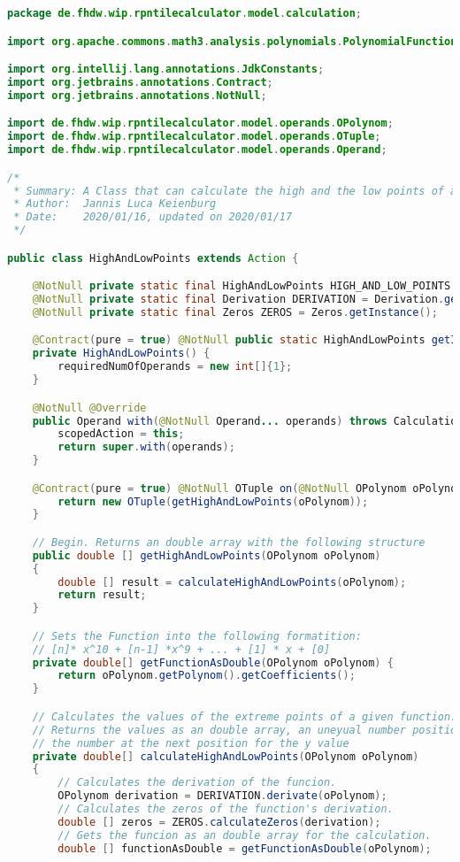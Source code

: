 \begin{lstlisting}[caption=HighAndLowPoints (Keienburg),label=list:HighAndLowPoints,language=Java]
package de.fhdw.wip.rpntilecalculator.model.calculation;

import org.apache.commons.math3.analysis.polynomials.PolynomialFunction;

import org.intellij.lang.annotations.JdkConstants;
import org.jetbrains.annotations.Contract;
import org.jetbrains.annotations.NotNull;

import de.fhdw.wip.rpntilecalculator.model.operands.OPolynom;
import de.fhdw.wip.rpntilecalculator.model.operands.OTuple;
import de.fhdw.wip.rpntilecalculator.model.operands.Operand;

/*
 * Summary: A Class that can calculate the high and the low points of a function( up to third grade)
 * Author:  Jannis Luca Keienburg
 * Date:    2020/01/16, updated on 2020/01/17
 */

public class HighAndLowPoints extends Action {

    @NotNull private static final HighAndLowPoints HIGH_AND_LOW_POINTS = new HighAndLowPoints();
    @NotNull private static final Derivation DERIVATION = Derivation.getInstance();
    @NotNull private static final Zeros ZEROS = Zeros.getInstance();

    @Contract(pure = true) @NotNull public static HighAndLowPoints getInstance() { return HIGH_AND_LOW_POINTS; }
    private HighAndLowPoints() {
        requiredNumOfOperands = new int[]{1};
    }

    @NotNull @Override
    public Operand with(@NotNull Operand... operands) throws CalculationException {
        scopedAction = this;
        return super.with(operands);
    }

    @Contract(pure = true) @NotNull OTuple on(@NotNull OPolynom oPolynom) {
        return new OTuple(getHighAndLowPoints(oPolynom));
    }

    // Begin. Returns an double array with the following structure
    public double [] getHighAndLowPoints(OPolynom oPolynom)
    {
        double [] result = calculateHighAndLowPoints(oPolynom);
        return result;
    }

    // Sets the Function into the following formatition:
    // [n]* x^10 + [n-1] *x^9 + ... + [1] * x + [0]
    private double[] getFunctionAsDouble(OPolynom oPolynom) {
        return oPolynom.getPolynom().getCoefficients();
    }

    // Calculates the values of the extreme points of a given function.
    // Returns the values as an double array, an uneyual number position stands for the x value,
    // the number at the next position for the y value
    private double[] calculateHighAndLowPoints(OPolynom oPolynom)
    {
        // Calculates the derivation of the funcion.
        OPolynom derivation = DERIVATION.derivate(oPolynom);
        // Calculates the zeros of the function's derivation.
        double [] zeros = ZEROS.calculateZeros(derivation);
        // Gets the funcion as an double array for the calculation.
        double [] functionAsDouble = getFunctionAsDouble(oPolynom);


\end{lstlisting}
